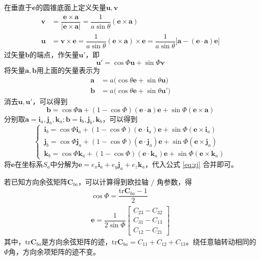 \noindent 在垂直于$\bm{e}$的圆锥底面上定义矢量$\bm{u}, \bm{v}$
\begin{align*}
	\bm{v} & = \dfrac{\bm{e} \times \bm{a}}{\big| \bm{e} \times \bm{a} \big|} = \dfrac{1}{a \sin \theta}(\bm{e} \times \bm{a}) \\
	\bm{u} & = \bm{v} \times \bm{e} = \dfrac{1}{a \sin \theta} (\bm{e} \times \bm{a}) \times \bm{e} = \dfrac{1}{a \sin \theta}\big[ \bm{a} - (\bm{e} \cdot \bm{a})\bm{e} \big] 
\end{align*}
过矢量$\bm{b}$的端点，作矢量$\bm{u}'$，即
\begin{equation*}
	\bm{u}' = \cos \varPhi \bm{u} + \sin \varPhi \bm{v}
\end{equation*}
将矢量$\bm{a}, \bm{b}$用上面的矢量表示为
\begin{align}
	\bm{a} & = a \big( \cos \theta \bm{e} + \sin \theta \bm{u} \big) \\
	\bm{b} & = a \big( \cos \theta \bm{e} + \sin \theta \bm{u}' \big)
\end{align}
消去$\bm{u}, \bm{u}'$，可以得到
\begin{equation}
	\bm{b} = \cos \varPhi \bm{a} + ( 1 - \cos \varPhi ) (\bm{e} \cdot \bm{a})\bm{e} + \sin \varPhi(\bm{e} \times \bm{a})
\end{equation}
分别取$\bm{a} = \bm{i}_a, \bm{j}_a, \bm{k}_a; \bm{b} = \bm{i}_b, \bm{j}_b, \bm{k}_b$，可以得到
\begin{equation}
	\begin{cases}
		\, \bm{i}_b = \cos \varPhi \bm{i}_a+ ( 1 - \cos \varPhi ) (\bm{e} \cdot \bm{i}_a)\bm{e} + \sin \varPhi(\bm{e} \times \bm{i}_a) \\
		\, \bm{j}_b = \cos \varPhi \bm{j}_a+ ( 1 - \cos \varPhi ) (\bm{e} \cdot \bm{j}_a)\bm{e} + \sin \varPhi(\bm{e} \times \bm{j}_a) \\
		\, \bm{k}_b = \cos \varPhi \bm{k}_a+ ( 1 - \cos \varPhi ) (\bm{e} \cdot \bm{k}_a)\bm{e} + \sin \varPhi(\bm{e} \times \bm{k}_a)
	\end{cases}
	\label{eq:zj}
\end{equation}
将$\bm{e}$在坐标系$S_a$中分解为$\bm{e} = e_x \bm{i}_a + e_y \bm{j}_a + e_z \bm{k}_a $，代入公式 \eqref{eq:zj} 合并即可。
\vspace*{1em}



若已知方向余弦矩阵$\bm{C}_{ba}$，可以计算得到欧拉轴 / 角参数，得
\begin{align}
	\cos \varPhi = \dfrac{\text{tr} \bm{C}_{ba} - 1}{2} \\
	\bm{e} = \dfrac{1}{2 \sin \varPhi} 
	\begin{bmatrix}
		C_{23} - C_{32} \\
		C_{31} - C_{13} \\
		C_{12} - C_{21}
	\end{bmatrix}
\end{align}
其中，$\text{tr} \bm{C}_{ba}$是方向余弦矩阵的迹，$\text{tr} \bm{C}_{ba} = C_{11} + C_{12} + C_{13}$。绕任意轴转动相同的$\varPhi$角，方向余项矩阵的迹不变。
\clearpage


